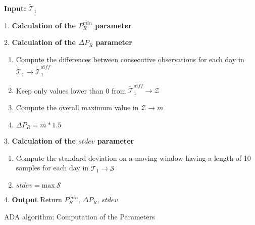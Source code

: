 \documentclass{article}
\begin{document}
\begin{algorithm}[t]
\begin{minipage}[tb]{0.48\textwidth}
\textbf{Input: }  $\widetilde{\mathcal{T}}_1$

1. \textbf{Calculation of the $P_R^{min}$ parameter}\
   \begin{algorithmic}[1]
        \State{ $P_R^{min} = \text{min} \ \boldsymbol{a}$}
    \end{algorithmic}

2. \textbf{Calculation of the $\Delta P_R$ parameter}    
    \begin{enumerate}
        \item Compute the differences between consecutive observations for each day in $ \widetilde{\mathcal{T}}_1 \rightarrow \widetilde{\mathcal{T}}_1^{diff}$
        \item Keep only values lower than 0 from $\widetilde{\mathcal{T}}_1^{diff} \rightarrow \mathcal{Z}$
        \item Compute the overall maximum value in $\mathcal{Z} \rightarrow m$
        \item $\Delta P_R = m * 1.5$
    \end{enumerate}
3. \textbf{Calculation of the $stdev$ parameter}
    \begin{enumerate}
        \item Compute the standard deviation on a moving window having a length of 10 samples for each day in $\widetilde{\mathcal{T}}_1 \rightarrow \mathcal{S}$
        \item  $stdev = \text{max} \ \mathcal{S}$
    \end{enumerate}
4. \textbf{Output} Return $P_R^{min}$, $\Delta P_R$, $stdev$
\caption{ADA algorithm: Computation of the Parameters}
\label{algo:parameters}
\end{minipage}
\end{algorithm}
\end{document}
